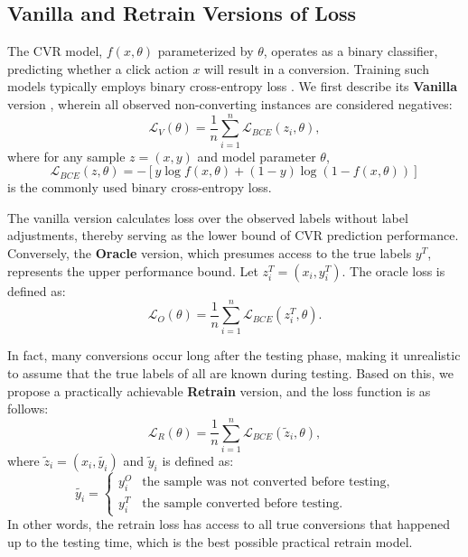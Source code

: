 \subsection{Vanilla and Retrain Versions of Loss}
The CVR model, $f(x,\theta)$ parameterized by $\theta$, operates as a binary classifier, predicting whether a click action $x$ will result in a conversion. Training such models typically employs binary cross-entropy loss \cite{dai2023dually,wang2023unbiased}. We first describe its \textbf{Vanilla} version \cite{chapelle2014modeling,yasui2020feedback}, wherein all observed non-converting instances are considered negatives:
\begin{equation}
\label{vanilla}
\mathcal{L}_{ {V }} (\theta) = \frac{1}{n} \sum_{i=1}^{n} \mathcal{L}_{BCE}(z_i, \theta),
\end{equation}
where for any sample $z = (x, y)$ and model parameter $\theta$,
$$\mathcal{L}_{BCE}(z, \theta) = - [ y \log f\left(x ,\theta\right)+\left(1-y\right) \log \left(1-f\left(x ,\theta\right)\right) ]$$ 
is the commonly used binary cross-entropy loss.

The vanilla version calculates loss over the observed labels without label adjustments, thereby serving as the lower bound of CVR prediction performance. Conversely, the \textbf{Oracle} version, which presumes access to the true labels $y^{T}$, represents the upper performance bound. Let $z_i^T = (x_i, y_i^T)$. The oracle loss is defined as:
\begin{equation}
\label{oracle}
\mathcal{L}_{{O}} (\theta) =\frac{1}{n} \sum_{i=1}^{n}\mathcal{L}_{BCE}(z_i^T, \theta).
\end{equation}

In fact, many conversions occur long after the testing phase, making it unrealistic to assume that the true labels of all are known during testing. Based on this, we propose a practically achievable \textbf{Retrain} version, and the loss function is as follows:
\begin{equation}
\label{retrain}
\mathcal{L}_{{R}}(\theta) =\frac{1}{n} \sum_{i=1}^{n}\mathcal{L}_{BCE}(\tilde{z}_i, \theta),
\end{equation}
where $\tilde{z}_i = (x_i, \tilde{y_i})$ and $\tilde{y}_i$ is defined as:
\[
\tilde{y_i} =
\begin{cases} 
y_i^{O} & \text{the sample was not converted before testing}, \\
y_i^{T} & \text{the sample converted before testing}. 
\end{cases}
\]
In other words, the retrain loss has access to all true conversions that happened up to the testing time, which is the best possible practical retrain model.

